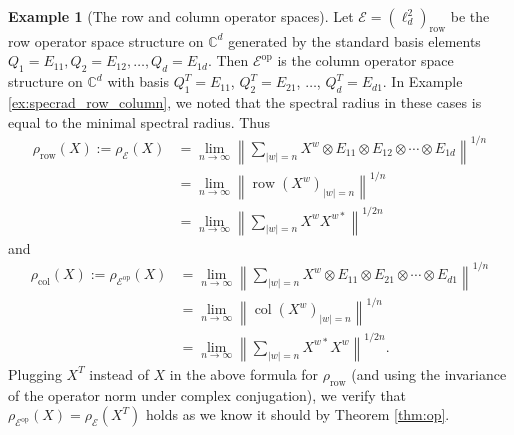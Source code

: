 \documentclass[12pt]{amsart}
\numberwithin{equation}{section}
\theoremstyle{definition}
\newtheorem{example}[theorem]{Example}
\newcommand{\cE}{\mathcal{E}}
\newcommand{\bC}{\mathbb{C}}
\DeclareMathOperator{\op}{op}
\begin{document}
\begin{example}[The row and column operator spaces]\label{ex:row_col_equal}
Let $\cE = \left(\ell^2_d\right)_{\operatorname{row}}$ be the row operator space structure on $\bC^d$ generated by the standard basis elements $Q_1 = E_{11}, Q_2 = E_{12}, \ldots , Q_d = E_{1d}$. Then $\cE^{\op}$ is the column operator space structure on $\bC^d$ with basis $Q_1^T = E_{11}$, $Q_2^T = E_{21}$, $\ldots$, $Q_d^T = E_{d1}$. 
In Example \ref{ex:specrad_row_column}, we noted that the spectral radius in these cases is equal to the minimal spectral radius. 
Thus
\begin{align*}
\rho_{\operatorname{row}}(X) := \rho_\cE(X) &= \lim_{n \to \infty} \left\|\sum_{|w|=n} X^w \otimes E_{11} \otimes E_{12} \otimes \cdots \otimes E_{1d} 
\right\|^{1/n} \\
&= \lim_{n \to \infty} \left\|\operatorname{row} \left( X^w \right)_{|w|=n} \right\|^{1/n} \\
&= \lim_{n\to \infty} \left\| \sum_{|w|=n} X^w X^{w*} \right\|^{1/2n} 
\end{align*}
and
\begin{align*}
\rho_{\operatorname{col}}(X) := \rho_{\cE^{\op}}(X) &= \lim_{n \to \infty} \left\|\sum_{|w|=n} X^w \otimes E_{11} \otimes E_{21} \otimes \cdots \otimes E_{d1} 
\right\|^{1/n} \\
&= \lim_{n \to \infty} \left\|\operatorname{col} \left( X^w \right)_{|w|=n} \right\|^{1/n} \\
&= \lim_{n\to \infty} \left\| \sum_{|w|=n} X^{w*} X^w \right\|^{1/2n} .
\end{align*}
Plugging $X^T$ instead of $X$ in the above formula for $\rho_{\operatorname{row}}$ (and using the invariance of the operator norm under complex conjugation), we verify that $\rho_{\cE^{\op}}(X) = \rho_{\cE}(X^T)$ holds as we know it should by Theorem \ref{thm:op}. 


\end{example}
\end{document}
